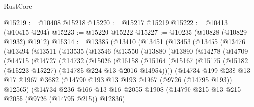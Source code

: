 \begin{lexlean}{RustCore}
\begin{coremodule}
@15219 := @10408 @15218
@15220 := @15217 @15219
@15222 := @10413 (@10415 @204)
@15223 := @15220 @15222
@15227 := @10235 (@10828 (@10829 @1932) @1912)
@15314 := @13385
    (@13410
      (@13451
        (@13453
          (@13455
            (@13476
              (@13494
                (@13511
                  (@13535
                    (@13546
                      (@13550
                        (@13880
                          (@13890
                            (@14278
                              (@14709
                                (@14715
                                  (@14727
                                    (@14732
                                      (@15026
                                        (@15158
                                          (@15164
                                            (@15167
                                              (@15175
                                                (@15182
                                                  (@15223 @15227)
                                                  (@14785 @224 @13 @2016 @14954))))
                                            (@14734
                                              @199
                                              @238
                                              @13
                                              @17
                                              @1967
                                              @3682
                                              (@14790
                                                @193
                                                @13
                                                @193
                                                @1967
                                                (@9726 (@14795 @193))
                                                @12565)
                                              (@14734
                                                @236
                                                @166
                                                @13
                                                @16
                                                @2055
                                                @1908
                                                (@14790
                                                  @215
                                                  @13
                                                  @215
                                                  @2055
                                                  (@9726 (@14795 @215))
                                                  @12836)

\end{coremodule}
\end{lexlean}
